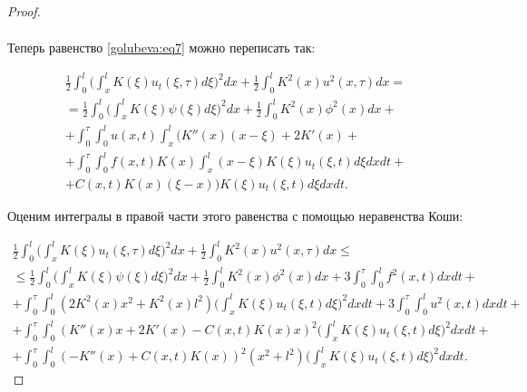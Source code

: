 \begin{proof}
\begin{multline*}
\end{multline*}

Теперь равенство \eqref{golubeva:eq7} можно переписать так:

\begin{multline*}

\frac{1}{2}\int _{0}^{l}\biggl(\int _{x}^{l}K(\xi )u_{t}(\xi , \tau )d\xi \biggr)^{2}dx+\frac{1}{2}\int _{0}^{l}K^{2}(x)u^{2}(x, \tau )dx=\\

=\frac{1}{2}\int _{0}^{l}\biggl(\int _{x}^{l}K(\xi )\psi (\xi )d\xi \biggr)^{2}dx+\frac{1}{2}\int _{0}^{l}K^{2}(x)\phi ^{2}(x)dx+\\

+\int _{0}^{\tau }\int _{0}^{l}u(x, t)\int _{x}^{l}(K''(x)(x-\xi )+2K'(x)+ \\ +

\int _{0}^{\tau }\int _{0}^{l}f(x, t)K(x)\int _{x}^{l}(x-\xi )K(\xi )u_{t}(\xi , t)d\xi dxdt + \\ +

C(x, t)K(x)(\xi -x))K(\xi )u_{t}(\xi, t)d\xi dxdt.

\end{multline*}

Оценим интегралы в правой части этого равенства с помощью неравенства Коши:

\begin{multline*}

\frac{1}{2}\int _{0}^{l}\biggl(\int _{x}^{l}K(\xi )u_{t}(\xi , \tau )d\xi \biggr)^{2}dx+\frac{1}{2}\int _{0}^{l}K^{2}(x)u^{2}(x, \tau )dx\leq \\

\leq \frac{1}{2}\int _{0}^{l}\biggl(\int _{x}^{l}K(\xi )\psi (\xi )d\xi \biggr)^{2}dx+

\frac{1}{2}\int _{0}^{l}K^{2}(x)\phi ^{2}(x)dx+3\int _{0}^{\tau }\int _{0}^{l}f^{2}(x, t)dxdt+\\

+\int _{0}^{\tau }\!\! \int _{0}^{l}(2K^{2}(x)x^{2}+K^{2}(x)l^{2})\biggl(\int _{x}^{l}K(\xi )u_{t}(\xi ,t)d\xi \biggr)^{2}dxdt+

3\int _{0}^{\tau }\!\!\int _{0}^{l}u^{2}(x, t)dxdt+\\

+\int _{0}^{\tau }\int _{0}^{l}(K''(x)x+2K'(x)-C(x, t)K(x)x)^{2}\biggl(\int _{x}^{l}K(\xi )u_{t}(\xi , t)d\xi \biggr)^{2}dxdt+\\

+\int _{0}^{\tau }\int _{0}^{l}(-K''(x)+C(x, t)K(x))^{2}(x^{2}+l^{2})\biggl(\int _{x}^{l}K(\xi )u_{t}(\xi , t)d\xi \biggr)^{2}dxdt.


\end{multline*}
\end{proof}
